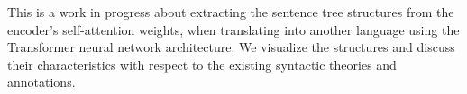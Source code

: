 This is a work in progress about extracting the sentence tree structures from the encoder's self-attention weights, when translating into another language using the Transformer neural network architecture. We visualize the structures and discuss their characteristics with respect to the existing syntactic theories and annotations.
